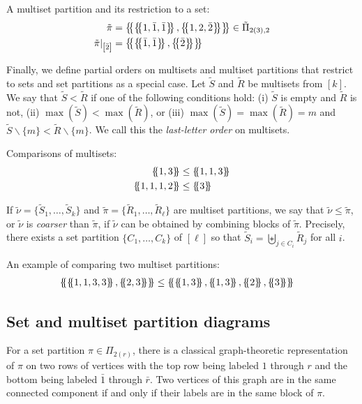 \documentclass[ALCO,Unicode,published]{cedram}
\newcommand{\tpi}{{\tilde{\pi}}}
\newcommand{\tnu}{{\tilde{\nu}}}
\newcommand{\tS}{{\tilde{S}}}
\newcommand{\tR}{{\tilde{R}}}
\newcommand{\multi}[1]{\left\{\mskip-5mu\left\{#1\right\}\mskip-5mu\right\}}
\newcommand{\ov}[1]{\bar{#1}}
\newcommand{\ovb}[1]{\left[\ov{#1}\right]}
\newcommand{\defn}[1]{\textcolor{defncolor}{\emph{#1}}}
\begin{document}
\begin{exam} A multiset partition and its restriction to a set:
    \begin{align*}
        \tpi&=\multi{\multi{1,\ov1,\ov1},\multi{1,2,\ov2}}\in\tilde\Pi_{2(3),2}\\
        \tpi|_{\ovb2}&=\multi{\multi{\ov1,\ov1},\multi{\ov2}}
    \end{align*}
\end{exam}

Finally, we define partial orders on multisets and multiset partitions that restrict to sets and set partitions as a special case. Let $\tS$ and $\tR$ be multisets from $[k]$. We say that $\tS<\tR$ if one of the following conditions hold: (i) $\tS$ is empty and $\tR$ is not, (ii) $\max(\tS)<\max(\tR)$, or (iii) $\max(\tS)=\max(\tR)=m$ and $\tS\smallsetminus\{m\}<\tR\smallsetminus\{m\}$. We call this the \defn{last-letter order} on multisets.

\begin{exam} Comparisons of multisets:
    \begin{align*}
        \multi{1,3}&\leq\multi{1,1,3}\\
        \multi{1,1,1,2}&\leq\multi{3}
    \end{align*}
\end{exam}

If $\tnu=\{\tS_1,\dots,\tS_k\}$ and $\tpi=\{\tR_1,\dots,\tR_\ell\}$ are multiset partitions, we say that $\tnu\leq\tpi$, or $\tnu$ is \defn{coarser} than $\tpi$, if $\tnu$ can be obtained by combining blocks of $\tpi$. Precisely, there exists a set partition $\{C_1,\dots,C_k\}$ of $[\ell]$ so that $\tilde{S}_i=\biguplus_{j\in C_i}\tilde{R}_j$ for all $i$.

\begin{exam} An example of comparing two multiset partitions:
    \begin{align*}
        \multi{\multi{1,1,3,3},\multi{2,3}}&\leq\multi{\multi{1,3},\multi{1,3},\multi{2},\multi{3}}
    \end{align*}
\end{exam}

\subsection[Diagrams]{Set and multiset partition diagrams}

For a set partition $\pi\in\Pi_{2(r)}$, there is a classical graph-theoretic representation of $\pi$ on two rows of vertices with the top row being labeled $1$ through $r$ and the bottom being labeled $\ov1$ through $\ov{r}$. Two vertices of this graph are in the same connected component if and only if their labels are in the same block of $\pi$. 
\end{document}
